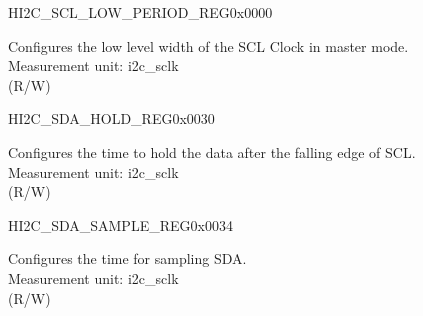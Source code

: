 \begin{register}{H}{I2C\_SCL\_LOW\_PERIOD\_REG}{0x0000}\label{regdesc:I2CSCLLOWPERIODREG}
%
%
\regnewline%
\begin{regdesc}\begin{reglist}
\label{fielddesc:I2CSCLLOWPERIOD}\item [I2C\_SCL\_LOW\_PERIOD] Configures the low level width of the SCL Clock in master mode. \\
Measurement unit: i2c\_sclk \\ (R/W)
\end{reglist}\end{regdesc}
\end{register}


\begin{register}{H}{I2C\_SDA\_HOLD\_REG}{0x0030}\label{regdesc:I2CSDAHOLDREG}
%
%
\regnewline%
\begin{regdesc}\begin{reglist}
\label{fielddesc:I2CSDAHOLDTIME}\item [I2C\_SDA\_HOLD\_TIME] Configures the time to hold the data after the falling edge of SCL.\\
Measurement unit: i2c\_sclk \\ (R/W)
\end{reglist}\end{regdesc}
\end{register}


\begin{register}{H}{I2C\_SDA\_SAMPLE\_REG}{0x0034}\label{regdesc:I2CSDASAMPLEREG}
%
%
\regnewline%
\begin{regdesc}\begin{reglist}
\label{fielddesc:I2CSDASAMPLETIME}\item [I2C\_SDA\_SAMPLE\_TIME] Configures the time for sampling SDA.\\
Measurement unit: i2c\_sclk \\ (R/W)
\end{reglist}\end{regdesc}
\end{register}


